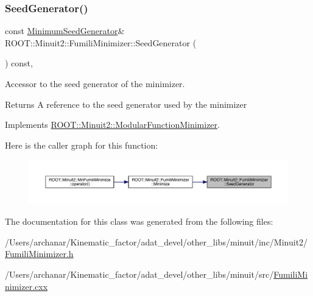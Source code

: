 \mbox{\label{classROOT_1_1Minuit2_1_1FumiliMinimizer_ad8906dbac7f0c20284e361be606d5634}} 
\subsubsection{\texorpdfstring{SeedGenerator()}{SeedGenerator()}\hspace{0.1cm}{\footnotesize\ttfamily [2/2]}}
{\footnotesize\ttfamily const \mbox{\hyperlink{classROOT_1_1Minuit2_1_1MinimumSeedGenerator}{Minimum\+Seed\+Generator}}\& R\+O\+O\+T\+::\+Minuit2\+::\+Fumili\+Minimizer\+::\+Seed\+Generator (\begin{DoxyParamCaption}{ }\end{DoxyParamCaption}) const\hspace{0.3cm}{\ttfamily [inline]}, {\ttfamily [virtual]}}

Accessor to the seed generator of the minimizer.

\begin{DoxyReturn}{Returns}
A reference to the seed generator used by the minimizer 
\end{DoxyReturn}


Implements \mbox{\hyperlink{classROOT_1_1Minuit2_1_1ModularFunctionMinimizer_a742930de97b0ce9ba23773874ae0894b}{R\+O\+O\+T\+::\+Minuit2\+::\+Modular\+Function\+Minimizer}}.

Here is the caller graph for this function\+:\nopagebreak
\begin{figure}[H]
\begin{center}
\leavevmode
\includegraphics[width=350pt]{db/da1/classROOT_1_1Minuit2_1_1FumiliMinimizer_ad8906dbac7f0c20284e361be606d5634_icgraph}
\end{center}
\end{figure}


The documentation for this class was generated from the following files\+:\begin{DoxyCompactItemize}
\item 
/\+Users/archanar/\+Kinematic\+\_\+factor/adat\+\_\+devel/other\+\_\+libs/minuit/inc/\+Minuit2/\mbox{\hyperlink{other__libs_2minuit_2inc_2Minuit2_2FumiliMinimizer_8h}{Fumili\+Minimizer.\+h}}\item 
/\+Users/archanar/\+Kinematic\+\_\+factor/adat\+\_\+devel/other\+\_\+libs/minuit/src/\mbox{\hyperlink{FumiliMinimizer_8cxx}{Fumili\+Minimizer.\+cxx}}\end{DoxyCompactItemize}
